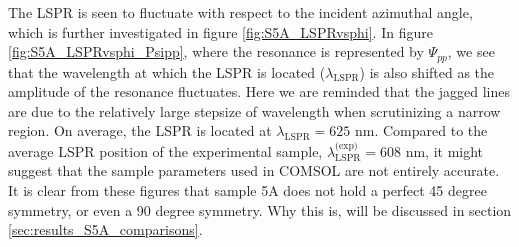 The LSPR is seen to fluctuate with respect to the incident azimuthal angle, which is further investigated in figure \ref{fig:S5A_LSPRvsphi}. In figure \ref{fig:S5A_LSPRvsphi_Psipp}, where the resonance is represented by $\Psi_{pp}$, we see that the wavelength at which the LSPR is located ($\lambda_{\text{LSPR}}$) is also shifted as the amplitude of the resonance fluctuates. Here we are reminded that the jagged lines are due to the relatively large stepsize of wavelength when scrutinizing a narrow region. On average, the LSPR is located at $\lambda_{\text{LSPR}}=625$ nm. Compared to the average LSPR position of the experimental sample, $\lambda_{\text{LSPR}}^\text{(exp)}=608$ nm, it might suggest that the sample parameters used in COMSOL are not entirely accurate. It is clear from these figures that sample 5A does not hold a perfect 45 degree symmetry, or even a 90 degree symmetry. Why this is, will be discussed in section \ref{sec:results_S5A_comparisons}.
 
